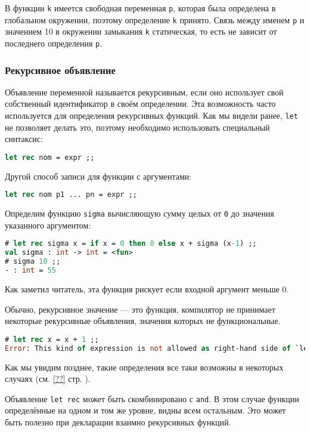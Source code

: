 В функции \texttt{k} имеется свободная переменная \texttt{p}, которая была
определена в глобальном окружении, поэтому определение \texttt{k} принято. Связь
между именем \texttt{p} и значением 10 в окружении замыкания \texttt{k}
статическая, то есть не зависит от последнего определения \texttt{p}.

\subsubsection{Рекурсивное объявление}

Объявление переменной называется рекурсивным, если оно использует свой
собственный идентификатор в своём определении. Эта возможность часто
используется для определения рекурсивных функций. Как мы видели ранее,
\texttt{let} не позволяет делать это, поэтому необходимо использовать
специальный синтаксис:

\begin{lstlisting}[language=OCaml]
let rec nom = expr ;;
\end{lstlisting}

Другой способ записи для функции с аргументами:

\begin{lstlisting}[language=OCaml]
let rec nom p1 ... pn = expr ;;
\end{lstlisting}

Определим функцию \texttt{sigma} вычисляющую сумму целых от \texttt{0} до
значения указанного аргументом:

\begin{lstlisting}[language=OCaml]
# let rec sigma x = if x = 0 then 0 else x + sigma (x-1) ;;
val sigma : int -> int = <fun>
# sigma 10 ;;
- : int = 55
\end{lstlisting}

Как заметил читатель, эта функция рискует  если входной
аргумент меньше 0.

Обычно, рекурсивное значение --- это функция, компилятор не принимает некоторые
рекурсивные объявления, значения которых не функциональные.

\begin{lstlisting}[language=OCaml]
# let rec x = x + 1 ;;
Error: This kind of expression is not allowed as right-hand side of `let rec'
\end{lstlisting}

Как мы увидим позднее, такие определения все таки возможны в некоторых случаях
(см. \ref{??} стр. \pageref{??}).

Объявление \texttt{let rec} может быть скомбинировано с \texttt{and}. В этом
случае функции определённые на одном и том же уровне, видны всем остальным. Это
может быть полезно при декларации взаимно рекурсивных функций.

